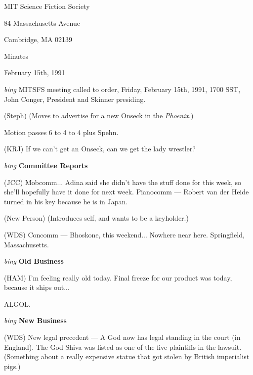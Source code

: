 \setlength{\topmargin}{-0.5in}
\setlength{\oddsidemargin}{0.0in}
\setlength{\evensidemargin}{0.0in}
\setlength{\textheight}{9in}
\setlength{\textwidth}{6.5in}



\begin{center}
MIT Science Fiction Society

84 Massachusetts Avenue

Cambridge, MA 02139

\vspace{0.2in}
Minutes

February 15th, 1991

\end{center}

\vspace{0.15in}
{\em bing\/}  MITSFS meeting called to order, Friday, February 15th, 1991,
1700 SST, John Conger, President and Skinner presiding.

(Steph) (Moves to advertise for a new Onseck in the {\em Phoenix}.)

Motion passes 6 to 4 to 4 plus Spehn.

(KRJ) If we can't get an Onseck, can we get the lady wrestler?

\vspace{0.15in}
{\em bing\/} {\bf Committee Reports\/}

(JCC) Mobcomm...  Adina said she didn't have the stuff done for this week,
so she'll hopefully have it done for next week.  Pianocomm --- Robert van der
Heide turned in his key because he is in Japan.

(New Person) (Introduces self, and wants to be a keyholder.)

(WDS) Concomm --- Bhoskone, this weekend...  Nowhere near here.  Springfield,
Massachusetts.

\vspace{.15in}
{\em bing\/} {\bf Old Business\/}

(HAM) I'm feeling really old today.  Final freeze for our product was today,
because it ships out...

ALGOL.

\vspace{0.15in}
{\em bing\/} {\bf New Business\/}

(WDS) New legal precedent --- A God now has legal standing in the court (in
England).  The God Shiva was listed as one of the five plaintiffs in the
lawsuit.  (Something about a really expensive statue that got stolen by
British imperialist pigs.)

